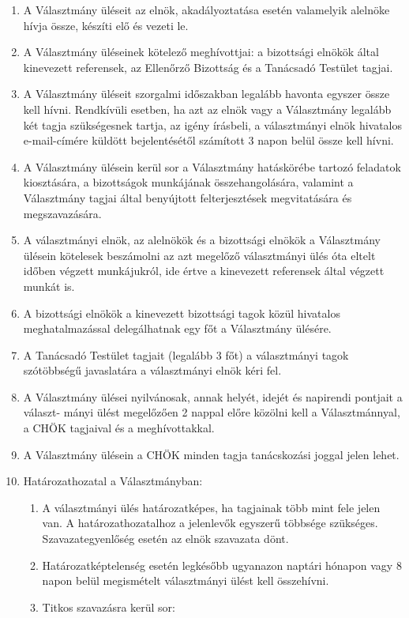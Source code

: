 \documentclass{../styles/rulebook}
\begin{document}
\begin{enumerate}
	\item A Választmány üléseit az elnök, akadályoztatása esetén valamelyik alelnöke hívja össze, készíti elő és vezeti le.
	\item A Választmány üléseinek kötelező meghívottjai: a bizottsági elnökök által kinevezett referensek, az Ellenőrző Bizottság és a Tanácsadó Testület tagjai.
	\item A Választmány üléseit szorgalmi időszakban legalább havonta egyszer össze kell hívni. Rendkívüli esetben, ha azt az elnök vagy a Választmány legalább két tagja szükségesnek tartja, az igény írásbeli, a választmányi elnök hivatalos e-mail-címére küldött bejelentésétől számított 3 napon belül össze kell hívni.
	\item A Választmány ülésein kerül sor a Választmány hatáskörébe tartozó feladatok kiosztására, a bizottságok munkájának összehangolására, valamint a Választmány tagjai által benyújtott felterjesztések megvitatására és megszavazására.
	\item A választmányi elnök, az alelnökök és a bizottsági elnökök a Választmány ülésein kötelesek beszámolni az azt megelőző választmányi ülés óta eltelt időben végzett munkájukról, ide értve a kinevezett referensek által végzett munkát is.
	\item A bizottsági elnökök a kinevezett bizottsági tagok közül hivatalos meghatalmazással delegálhatnak egy főt a Választmány ülésére.
	\item A Tanácsadó Testület tagjait (legalább 3 főt) a választmányi tagok szótöbbségű javaslatára a választmányi elnök kéri fel.
	\item A Választmány ülései nyilvánosak, annak helyét, idejét és napirendi pontjait a választ- mányi ülést megelőzően 2 nappal előre közölni kell a Választmánnyal, a CHÖK tagjaival és a meghívottakkal.
	\item A Választmány ülésein a CHÖK minden tagja tanácskozási joggal jelen lehet.
	\item Határozathozatal a Választmányban:
	\begin{enumerate}
		\item A választmányi ülés határozatképes, ha tagjainak több mint fele jelen van. A határozathozatalhoz a jelenlevők egyszerű többsége szükséges. Szavazategyenlőség esetén az elnök szavazata dönt.
		\item Határozatképtelenség esetén legkésőbb ugyanazon naptári hónapon vagy 8 napon belül megismételt választmányi ülést kell összehívni.
		\item Titkos szavazásra kerül sor:

\end{enumerate}
\end{enumerate}
\end{document}
